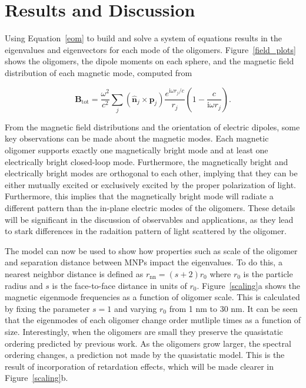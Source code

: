 \documentclass[12pt, letterpaper, twoside]{report}
\begin{document}
\section*{Results and Discussion}
Using Equation~\ref{eom} to build and solve a system of equations results in the eigenvalues and eigenvectors for each mode of the oligomers. Figure~\ref{field_plots} shows the oligomers, the dipole moments on each sphere, and the magnetic field distribution of each magnetic mode, computed from\cite{jackson_classical_1999}

\begin{equation}
\textbf{B}_{\textrm{tot}} = \frac{\omega^2}{c^2}\sum_{j}(\hat{\textbf{n}}_{j}\times\textbf{p}_{j})\frac{e^{\textrm{i}\omega r_j/c}}{r_j}\left(1 - \frac{c}{\textrm{i}\omega r_{j}}\right).
\label{magnetic_field}
\end{equation}

\noindent From the magnetic field distributions and the orientation of electric dipoles, some key observations can be made about the magnetic modes. Each magnetic oligomer supports exactly one magnetically bright mode and at least one electrically bright closed-loop mode. Furthermore, the magnetically bright and electrically bright modes are orthogonal to each other, implying that they can be either mutually excited or exclusively excited by the proper polarization of light. Furthermore, this implies that the magnetically bright mode will radiate a different pattern than the in-plane electric modes of the oligomers. These details will be significant in the discussion of observables and applications, as they lead to stark differences in the radaition pattern of light scattered by the oligomer.

The model can now be used to show how properties such as scale of the oligomer and separation distance between MNPs impact the eigenvalues. To do this, a nearest neighbor distance is defined as $r_{\textrm{nn}} = (s+2)r_0$ where $r_0$ is the particle radius and $s$ is the face-to-face distance in units of $r_0$. Figure~\ref{scaling}a shows the magnetic eigenmode frequencies as a function of oligomer scale. This is calculated by fixing the parameter $s=1$ and varying $r_0$ from 1 nm to 30 nm. It can be seen that the eigenmodes of each oligomer change order mutliple times as a function of size. Interestingly, when the oligomers are small they preserve the quasistatic ordering predicted by previous work\cite{Cherqui2014}. As the oligomers grow larger, the spectral ordering changes, a prediction not made by the quasistatic model. This is the result of incorporation of retardation effects, which will be made clearer in Figure~\ref{scaling}b.
\end{document}
